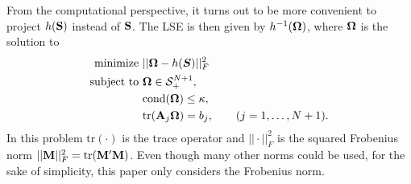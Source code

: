 \documentclass[11pt]{article}
\newcommand{\UNIT}{\text{UNIT}}
\newcommand{\SD}{\text{SD}}
\newcommand{\R}{\mathbb{R}}
\theoremstyle{definition}
\theoremstyle{definition}
\def\bSigma{{\bf \Sigma}}
\def\bOmega{{\bf \Omega}}
\def\A{{\bf A}}
\def\M{{\bf M}}
\def\SS{{\bf S}}
\def\cond{\text{cond}}
\def\Tr{\text{tr}}
\begin{document}
From the computational perspective, it turns out to be more convenient to project $h(\SS)$ instead of $\SS$.  The LSE is then given by $h^{-1}(\bOmega)$, where $\bOmega$ is the solution to
\begin{align}
 \label{lse_problem}
 \begin{split}
\text{minimize } &  || \bOmega - h(\boldsymbol{S}) ||_F^2\\
\text{subject to } & \bOmega \in \mathcal{S}_{+}^{N+1},\\
& \cond(\bOmega) \leq \kappa,\\
& \Tr(\A_j \bOmega) = b_j, \hspace{2em} (j = 1, \dots, N+1).
\end{split}
\end{align}
In this problem $\Tr(\cdot)$ is the trace operator and $||\cdot||_F^2$ is the squared Frobenius norm $||\M||_F^2 = \Tr(\M'\M)$. Even though many other norms could be used, for the sake of simplicity, this paper only considers the Frobenius norm. 
\end{document}
